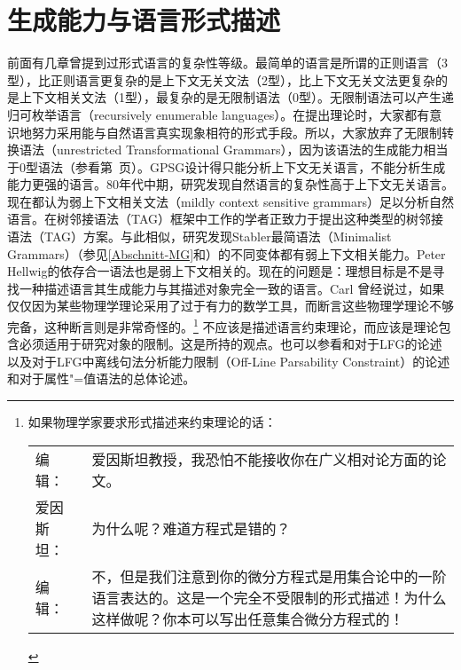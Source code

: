 
\chapter{生成能力与语言形式描述}
\label{sec-generative-capacity}

\largerpage[-1]
前面有几章曾提到过形式语言的复杂性等级。最简单的语言是所谓的正则语言（3型），比正则语言更复杂的是上下文无关文法（2型），比上下文无关文法更复杂的是上下文相关文法（1型），最复杂的是无限制语法（0型）。无限制语法可以产生递归可枚举语言（recursively enumerable languages）。在提出理论时，大家都有意识地努力采用能与自然语言真实现象相符的形式手段。所以，大家放弃了无限制转换语法（unrestricted Transformational Grammars），因为该语法的生成能力相当于0型语法（参看第~\pageref{page-TG-Typ0}页）。GPSG设计得只能分析上下文无关语言，不能分析生成能力更强的语言。80年代中期，研究发现自然语言的复杂性高于上下文无关语言\citep{Shieber85a,Culy85a}。现在都认为弱上下文相关文法（mildly context sensitive grammars）足以分析自然语言。在树邻接语法\indextag （TAG）框架中工作的学者正致力于提出这种类型的树邻接语法\indextagc （TAG）方案。与此相似，研究发现Stabler最简语法（Minimalist Grammars）\indexmgc （参见\ref{Abschnitt-MG}和\citealp{Stabler2001a,Stabler2010b}）的不同变体都有弱上下文相关能力\citep{Michaelis2001a-u}。Peter Hellwig的依存合一语法也是弱上下文相关的\citep[]{Hellwig2003a}。现在的问题是：理想目标是不是寻找一种描述语言其生成能力与其描述对象完全一致的语言。Carl \citet{Pollard96a}曾经说过，如果仅仅因为某些物理学理论采用了过于有力的数学工具，而断言这些物理学理论不够完备，这种断言则是非常奇怪的。\footnote{%
如果物理学家要求形式描述来约束理论的话：\\
\begin{tabular}{@{}l@{~}p{11cm}}
编辑：     & 爱因斯坦教授，我恐怕不能接收你在广义相对论方面的论文。\\
爱因斯坦： & 为什么呢？难道方程式是错的？\\
编辑：     & 不，但是我们注意到你的微分方程式是用集合论中的一阶语言表达的。这是一个完全不受限制的形式描述！为什么这样做呢？你本可以写出任意集合微分方程式的！ \citep{Pollard96a}
\end{tabular}
}
不应该是描述语言约束理论，而应该是理论包含必须适用于研究对象的限制。这是\citet[, 280]{Chomsky81b}所持的观点。也可以参看和对于LFG的论述以及对于LFG中离线句法分析能力限制（Off-Line Parsability Constraint）的论述和对于属性"=值语法的总体论述。

